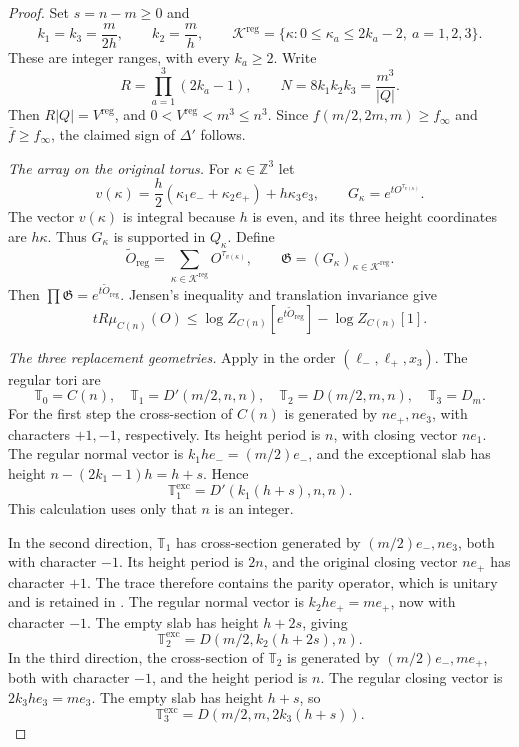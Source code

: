 \documentclass[11pt,letterpaper,reqno]{amsart}
\newcommand{\Z}{\mathbb Z}
\begin{document}
\begin{proof}
Set $s=n-m\ge0$ and
\[
 k_1=k_3=\frac{m}{2h},\qquad k_2=\frac mh,\qquad
 \mathcal K^{\mathrm{reg}}=
   \{\kappa:0\le\kappa_a\le2k_a-2,\ a=1,2,3\}.
\]
These are integer ranges, with every $k_a\ge2$. Write
\[
 R=\prod_{a=1}^3(2k_a-1),\qquad
 N=8k_1k_2k_3=\frac{m^3}{|Q|}.
\]
Then $R|Q|=V^{\mathrm{reg}}$, and
$0<V^{\mathrm{reg}}<m^3\le n^3$. Since
$f(m/2,2m,m)\ge f_\infty$ and $\bar f\ge f_\infty$,
the claimed sign of $\Delta'$ follows.

\emph{The array on the original torus.}
For $\kappa\in\Z^3$ let
\[
 v(\kappa)=\frac h2(\kappa_1e_-+\kappa_2e_+)
                         +h\kappa_3e_3,\qquad
 G_\kappa=e^{tO^{\tau_{v(\kappa)}}}.
\]
The vector $v(\kappa)$ is integral because $h$ is even, and its
three height coordinates are $h\kappa$. Thus $G_\kappa$ is
supported in $Q_\kappa$. Define
\[
 \widetilde O_{\mathrm{reg}}
     =\sum_{\kappa\in\mathcal K^{\mathrm{reg}}}
                               O^{\tau_{v(\kappa)}},\qquad
 \mathfrak G=(G_\kappa)_{\kappa\in\mathcal K^{\mathrm{reg}}}.
\]
Then $\prod\mathfrak G=e^{t\widetilde O_{\mathrm{reg}}}$.
Jensen's inequality and translation invariance give
\begin{equation}\label{eq:sides-jensen}
 tR\mu_{C(n)}(O)
 \le\log Z_{C(n)}[e^{t\widetilde O_{\mathrm{reg}}}]
                            -\log Z_{C(n)}[1].
\end{equation}

\emph{The three replacement geometries.}
Apply  in the order
$(\ell_-,\ell_+,x_3)$. The regular tori are
\[
 \mathbb T_0=C(n),\quad
 \mathbb T_1=D'(m/2,n,n),\quad
 \mathbb T_2=D(m/2,m,n),\quad
 \mathbb T_3=D_m.
\]
For the first step the cross-section of $C(n)$ is generated by
$ne_+,ne_3$, with characters $+1,-1$, respectively. Its height
period is $n$, with closing vector $ne_1$. The regular normal
vector is $k_1he_-=(m/2)e_-$, and the exceptional slab has height
$n-(2k_1-1)h=h+s$. Hence
\[
 \mathbb T_1^{\mathrm{exc}}=D'(k_1(h+s),n,n).
\]
This calculation uses only that $n$ is an integer.

In the second direction, $\mathbb T_1$ has cross-section generated
by $(m/2)e_-,ne_3$, both with character $-1$. Its height period is
$2n$, and the original closing vector $ne_+$ has character $+1$.
The trace therefore contains the parity operator, which is unitary
and is retained in . The regular
normal vector is $k_2he_+=me_+$, now with character $-1$.
The empty slab has height $h+2s$, giving
\[
 \mathbb T_2^{\mathrm{exc}}=D(m/2,k_2(h+2s),n).
\]
In the third direction, the cross-section of $\mathbb T_2$ is
generated by $(m/2)e_-,me_+$, both with character $-1$, and the
height period is $n$. The regular closing vector is $2k_3he_3=me_3$.
The empty slab has height $h+s$, so
\[
 \mathbb T_3^{\mathrm{exc}}=D(m/2,m,2k_3(h+s)).
\]


\end{proof}
\end{document}
